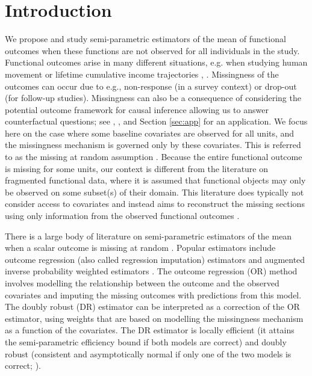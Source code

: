 \documentclass[12pt, A4]{article}
\begin{document}
\section{Introduction}\label{sec1}
        We propose and study semi-parametric estimators of the mean of functional outcomes when these functions are not observed for all individuals in the study. 
        Functional outcomes arise in many different situations, e.g. when studying human movement \citep{dannenmaier2020application} or lifetime cumulative income trajectories \citep{ecker2022regional}, \citep[see also][for further examples]{ullah2013applications}.
        Missingness of the outcomes can occur due to e.g., non-response (in a survey context) or drop-out (for follow-up studies). 
        Missingness can also be a consequence of considering the potential outcome framework for causal inference allowing us to answer counterfactual questions; see \cite{holland86}, \cite{missingcausal}, and Section \ref{sec:app} for an application. 
        We focus here on the case where some baseline covariates are observed for all units, and the missingness mechanism is governed only by these covariates. This is referred to as the missing at random assumption \cite[see e.g.,][]{tsiatis2006semiparametric, little2019statistical}. 
        Because the entire functional outcome is missing for some units, our context is different from the literature on fragmented functional data, where it is assumed that functional objects may only be observed on some subset(s) of their domain. 
        This literature does typically not consider access to covariates and instead aims to reconstruct the missing sections using only information from the observed functional outcomes \cite{delaigle2016approximating, kraus2019inferential, kneip2020optimal}.

        There is a large body of literature on semi-parametric estimators of the mean when a scalar outcome is missing at random \cite[e.g.,][]{tsiatis2006semiparametric, little2019statistical, molenberghs2015handbook}. 
        Popular estimators include outcome regression (also called regression imputation) estimators \cite[e.g.,][]{Tan,genback2019causal} and augmented inverse probability weighted estimators \cite[also called doubly robust estimators; e.g.,][]{robins1994estimation, bang2005doubly, kang2007demystifying}. 
        The outcome regression (OR) method involves modelling the relationship between the outcome and the observed covariates and imputing the missing outcomes with predictions from this model. 
        The doubly robust (DR) estimator can be interpreted as a correction of the OR estimator, using weights that are based on modelling the missingness mechanism as a function of the covariates. 
        The DR estimator is locally efficient (it attains the semi-parametric efficiency bound if both models are correct) and doubly robust (consistent and asymptotically normal if only one of the two models is correct;  \cite[e.g.,][]{Seaman:2018}).
\end{document}
